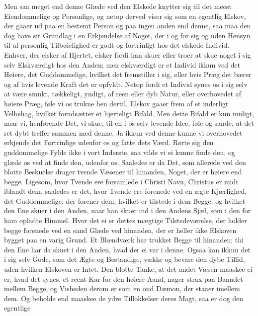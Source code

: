 \documentclass[12pt,a4paper]{book}
\newcommand{\apage}[1]{\marginnote{\footnotesize\textit{[#1]}}}
\begin{document}
Men saa meget end denne Glæde ved den Elskede knytter sig til det meest
Eiendommelige og Personlige, og netop derved viser sig som en egentlig
Elskov, der gaaer ud paa en bestemt Person og paa ingen anden end
denne, saa maa den dog have sit Grundlag i en Erkjendelse af Noget, der
i og for sig og uden Hensyn til al personlig Tilbøielighed er godt og
fortrinligt \apage{7} hos det elskede Individ. Enhver, der elsker af Hjertet,
elsker fordi han skuer eller troer at skue noget i sig selv Elskværdigt
hos den Anden; men elskværdigt er et Individ ikkun ved det Høiere, det
Guddommelige, hvilket det fremstiller i sig, eller hvis Præg det bærer
og af hvis levende Kraft det er opfyldt. Netop fordi et Individ synes
os i sig selv at være smukt, tækkeligt, yndigt, af reen eller dyb
Natur, eller overhovedet af høiere Præg, føle vi os trukne hen dertil.
Elskov gaaer frem af et inderligt Velbehag, hvilket forudsætter et
hjerteligt Bifald. Men dette Bifald er kun muligt, naar vi, henførende
Det, vi skue, til en i os selv levende Idee, føle og sande, at det ret
dybt treffer sammen med denne. Ja ikkun ved denne kunne vi overhovedet
erkjende det Fortrinlige udeufor os og fatte dets Værd. Rørte sig den
guddommelige Fylde ikke i vort Inderste, saa vilde vi ei kunne finde
den, og glæde os ved at finde den, udenfor os. Saaledes er da Det, som
allerede ved den blotte Beskuelse drager tvende Væsener til hinanden,
Noget, der er høiere end begge. Ligesom, hvor Tvende ere forsamlede i
Christi Navn, Christus er midt iblandt dem, saaledes er det, hvor
Tvende ere forenede ved en ægte Kjærlighed, det Guddommelige, der
forener dem, hvilket er tilstede i dem Begge, og hvilket den Ene skuer
i den Anden, naar han skuer ind i den Andens Sjæl, som i den for ham
opladte Himmel. Hvor det ei er dettes mægtige Tilstedeværelse, der
holder begge forenede ved en \apage{8} sand Glæde ved hinanden, der er heller
ikke Elskoven bygget paa en varig Grund. Et Blændværk har trukket Begge
til hinanden; thi den Ene har da skuet i den Anden, hvad der ei var i
denne. Ogsaa kan ikkun det i sig selv Gode, som det Ægte og Bestandige,
vække og bevare den dybe Tillid, uden hvilken Elskoven er Intet. Den
blotte Tanke, at det andet Væsen maaskee ei er, hvad det synes, et
reent Kar for den høiere Aand, nager strax paa Baandet mellem Begge, og
Visheden derom er som en ond Dæmon, der staaer imellem dem. Og beholde
end maaskee de ydre Tillokkelser deres Magt, saa er dog den egentlige
\end{document}
